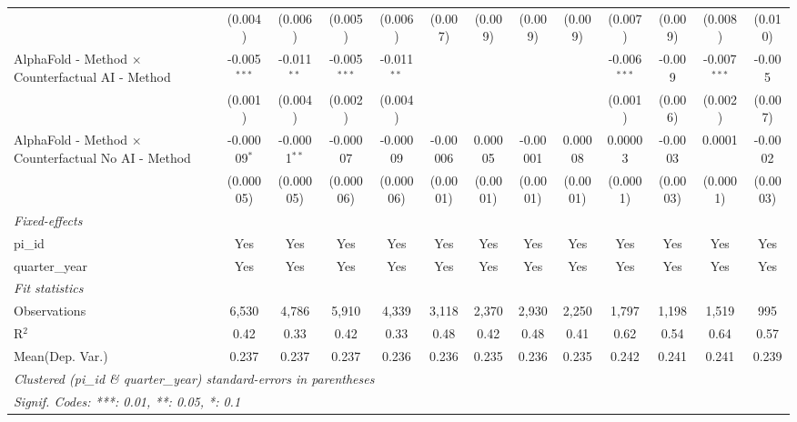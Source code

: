 \begin{tabular}{lcccccccccccc}
                                                              & (0.004)        & (0.006)        & (0.005)        & (0.006)       & (0.007)  & (0.009)  & (0.009)  & (0.009)  & (0.007)        & (0.009)       & (0.008)        & (0.010)\\   
   AlphaFold - Method $\times$ Counterfactual AI - Method     & -0.005$^{***}$ & -0.011$^{**}$  & -0.005$^{***}$ & -0.011$^{**}$ &          &          &          &          & -0.006$^{***}$ & -0.009        & -0.007$^{***}$ & -0.005\\   
                                                              & (0.001)        & (0.004)        & (0.002)        & (0.004)       &          &          &          &          & (0.001)        & (0.006)       & (0.002)        & (0.007)\\   
   AlphaFold - Method $\times$ Counterfactual No AI - Method  & -0.00009$^{*}$ & -0.0001$^{**}$ & -0.00007       & -0.00009      & -0.00006 & 0.00005  & -0.00001 & 0.00008  & 0.00003        & -0.0003       & 0.0001         & -0.0002\\   
                                                              & (0.00005)      & (0.00005)      & (0.00006)      & (0.00006)     & (0.0001) & (0.0001) & (0.0001) & (0.0001) & (0.0001)       & (0.0003)      & (0.0001)       & (0.0003)\\   
   \midrule
   \emph{Fixed-effects}\\
   pi\_id                                                     & Yes            & Yes            & Yes            & Yes           & Yes      & Yes      & Yes      & Yes      & Yes            & Yes           & Yes            & Yes\\  
   quarter\_year                                              & Yes            & Yes            & Yes            & Yes           & Yes      & Yes      & Yes      & Yes      & Yes            & Yes           & Yes            & Yes\\  
   \midrule
   \emph{Fit statistics}\\
   Observations                                               & 6,530          & 4,786          & 5,910          & 4,339         & 3,118    & 2,370    & 2,930    & 2,250    & 1,797          & 1,198         & 1,519          & 995\\  
   R$^2$                                                      & 0.42           & 0.33           & 0.42           & 0.33          & 0.48     & 0.42     & 0.48     & 0.41     & 0.62           & 0.54          & 0.64           & 0.57\\  
Mean(Dep. Var.) & 0.237 & 0.237 & 0.237 & 0.236 & 0.236 & 0.235 & 0.236 & 0.235 & 0.242 & 0.241 & 0.241 & 0.239 \\
   \midrule \midrule
   \multicolumn{13}{l}{\emph{Clustered (pi\_id \& quarter\_year) standard-errors in parentheses}}\\
   \multicolumn{13}{l}{\emph{Signif. Codes: ***: 0.01, **: 0.05, *: 0.1}}\\
\end{tabular}
\par\endgroup
